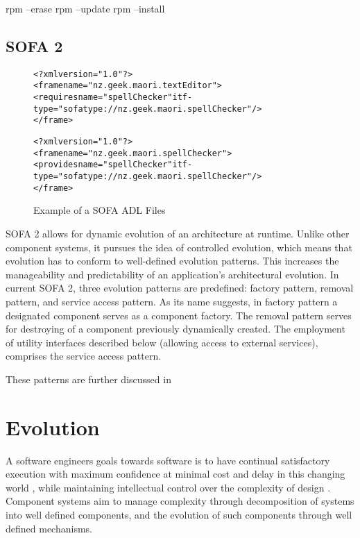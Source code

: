rpm --erase
rpm --update
rpm --install

\subsection{SOFA 2}

\begin{figure}[htp]
\begin{center}
\begin{alltt}
<?xml version="1.0"?>
<frame name="nz.geek.maori.textEditor">
  <requires name="spellChecker" itf-type="sofatype://nz.geek.maori.spellChecker"/>
</frame>

<?xml version="1.0"?>
<frame name="nz.geek.maori.spellChecker">
  <provides name="spellChecker" itf-type="sofatype://nz.geek.maori.spellChecker"/>
</frame>
\end{alltt}
  \caption[SOFA ADL files]{Example of a SOFA ADL Files}
  \label{osgibundle}
\end{center}
\end{figure}

SOFA 2 allows for dynamic evolution of an architecture at runtime. Unlike other component systems,
it pursues the idea of controlled evolution, which means that evolution has to conform to well-defined
evolution patterns. This increases the manageability and predictability of an application's architectural evolution. In current SOFA 2, three evolution patterns are predefined: factory pattern, removal
pattern, and service access pattern. As its name suggests, in factory pattern a designated component
serves as a component factory. The removal pattern serves for destroying of a component previously
dynamically created. The employment of utility interfaces described below (allowing access to external services), comprises the service access pattern.

These patterns are further discussed in \cite{Hnetynka2006}

\section{Evolution}
{}A software engineers goals towards software is to have continual satisfactory execution with maximum confidence at minimal cost and delay in this changing world \cite{Lehman2006}, 
{}while maintaining intellectual control over the complexity of design \cite{Brooks1975}.
{}Component systems aim to manage complexity through decomposition of systems into well defined components, and the evolution of such components through well defined mechanisms.

